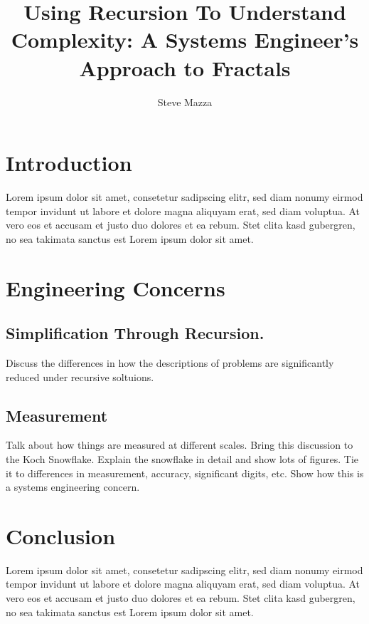 \documentclass[jou,apacite]{apa6}
\title{Using Recursion To Understand Complexity: A Systems Engineer's Approach to Fractals}
\author{Steve Mazza}
\affiliation{Naval Postgraduate School}
\begin{document}
\maketitle    
                        
\section{Introduction}
Lorem ipsum dolor sit amet, consetetur sadipscing elitr, sed diam nonumy eirmod
tempor invidunt ut labore et dolore magna aliquyam erat, sed diam voluptua. At
vero eos et accusam et justo duo dolores et ea rebum. Stet clita kasd gubergren,
no sea takimata sanctus est Lorem ipsum dolor sit amet.~\cite[page 112]{Axelrod}

\section{Engineering Concerns}


\subsection{Simplification Through Recursion.}
Discuss the differences in how the descriptions of problems are significantly reduced under recursive soltuions.

\subsection{Measurement}
Talk about how things are measured at different scales.  Bring this discussion to the Koch Snowflake.  Explain the snowflake in detail and show lots of figures.  Tie it to differences in measurement, accuracy, significant digits, etc.  Show how this is a systems engineering concern.

\section{Conclusion}
Lorem ipsum dolor sit amet, consetetur sadipscing elitr, sed diam nonumy eirmod
tempor invidunt ut labore et dolore magna aliquyam erat, sed diam voluptua. At
vero eos et accusam et justo duo dolores et ea rebum. Stet clita kasd gubergren,
no sea takimata sanctus est Lorem ipsum dolor sit amet.


\end{document}
